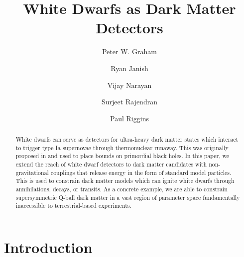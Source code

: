 \documentclass[twocolumn,preprintnumbers,amsmath,amssymb,prl, superscriptaddress]{revtex4}
\begin{document}


\title{White Dwarfs as Dark Matter Detectors}

\author{Peter W. Graham}

\author{Ryan Janish}

\author{Vijay Narayan}

\author{Surjeet Rajendran}

\author{Paul Riggins}

\begin{abstract}

White dwarfs can serve as detectors for ultra-heavy dark matter states which interact to trigger type Ia supernovae through thermonuclear runaway. 
This was originally proposed in \cite{Graham:2015apa} and used to place bounds on primordial black holes.
In this paper, we extend the reach of white dwarf detectors to dark matter candidates with non-gravitational couplings that release energy in the form of standard model particles.
This is used to constrain dark matter models which can ignite white dwarfs through annihilations, decays, or transits.
As a concrete example, we are able to constrain supersymmetric Q-ball dark matter in a vast region of parameter space fundamentally inaccessible to terrestrial-based experiments.


\end{abstract}
\maketitle

\section{Introduction}
\label{sec:Introduction}
\end{document}
